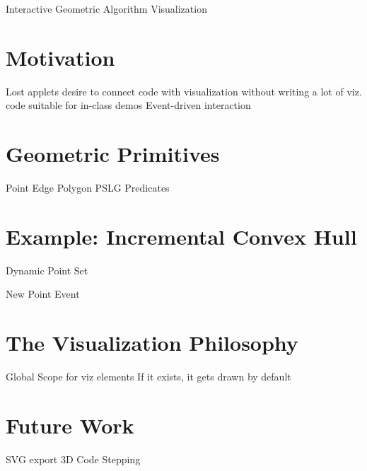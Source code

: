 Interactive Geometric Algorithm Visualization

\section{Motivation} %
\label{sec:motivation}

  Lost applets
  desire to connect code with visualization without writing a lot of viz. code
  suitable for in-class demos
  Event-driven interaction


\section{Geometric Primitives} %
\label{sec:geometric_primitives}

  Point
  Edge
  Polygon
  PSLG
  Predicates


\section{Example: Incremental Convex Hull} %
\label{sec:example_incremental_convex_hull}

  Dynamic Point Set
  
  New Point Event


\section{The Visualization Philosophy} %
\label{sec:the_visualization_philosophy}

  Global Scope for viz elements
  If it exists, it gets drawn by default


\section{Future Work} %
\label{sec:future_work}

  SVG export
  3D
  Code Stepping

